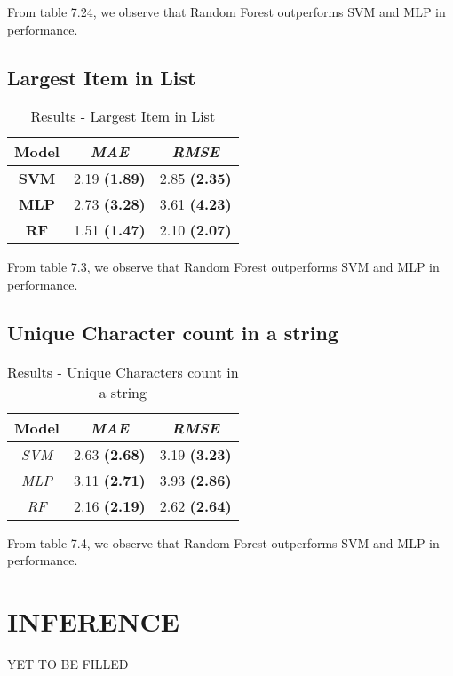 From table 7.24, we observe that Random Forest outperforms SVM and MLP in performance. 


\subsection{Largest Item in List}

\begin{table}[h]
\centering
\begin{tabular}{|c|c|c|}
\hline
\textbf{Model} & \textit{\textbf{MAE}} & \textit{\textbf{RMSE}} \\ \hline
\textbf{SVM}   & 2.19 \textbf{(1.89)}           & 2.85 \textbf{(2.35)}            \\ \hline
\textbf{MLP}   & 2.73 \textbf{(3.28)}           & 3.61 \textbf{(4.23) }           \\ \hline
\textbf{RF}    & 1.51 \textbf{(1.47)}           & 2.10 \textbf{(2.07)}            \\ \hline
\end{tabular}
\caption{Results - Largest Item in List}
\label{tab:larg-list}
\end{table}

From table 7.3, we observe that Random Forest outperforms SVM and MLP in performance. 


\subsection{Unique Character count in a string}

\begin{table}[h]
\centering
\begin{tabular}{|c|c|c|}
\hline
\textbf{Model} & \textit{\textbf{MAE}} & \textit{\textbf{RMSE}} \\ \hline
\textit{SVM} & 2.63 \textbf{(2.68)} & 3.19 \textbf{(3.23)} \\ \hline
\textit{MLP} & 3.11 \textbf{(2.71)} & 3.93 \textbf{(2.86)} \\ \hline
\textit{RF} & 2.16 \textbf{(2.19)} & 2.62 \textbf{(2.64)} \\ \hline
\end{tabular}
\caption{Results - Unique Characters count in a string}
\label{tab:unique}
\end{table}

From table 7.4, we observe that Random Forest outperforms SVM and MLP in performance. 

\section{INFERENCE}

YET TO BE FILLED
